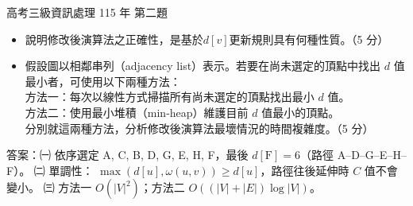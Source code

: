 \begin{pastexam}[label={px:gk3-115-ds-02}]{高考三級資訊處理 115 年 第二題}
\begin{itemize}[leftmargin=2.2em]
\begin{center}
\end{center}
\item[㈡] 說明修改後演算法之正確性，是基於$d[v]$更新規則具有何種性質。（5 分）
\item[㈢] 假設圖以相鄰串列（adjacency list）表示。若要在尚未選定的頂點中找出 $d$ 值最小者，可使用以下兩種方法：\\
方法一：每次以線性方式掃描所有尚未選定的頂點找出最小 $d$ 值。\\
方法二：使用最小堆積（min-heap）維護目前 $d$ 值最小的頂點。\\
分別就這兩種方法，分析修改後演算法最壞情況的時間複雜度。（5 分）
\end{itemize}
\end{pastexam}

\begin{pastsoln}
答案：㈠ 依序選定 A, C, B, D, G, E, H, F，最後 $d[\mathrm{F}] = 6$（路徑 A--D--G--E--H--F）。 ㈡ 單調性：
$\max(d[u], \omega(u,v)) \ge d[u]$，路徑往後延伸時 $C$ 值不會變小。 ㈢ 方法一 $O(|V|^2)$；方法二
$O((|V| + |E|)\log |V|)$。


\end{pastsoln}
